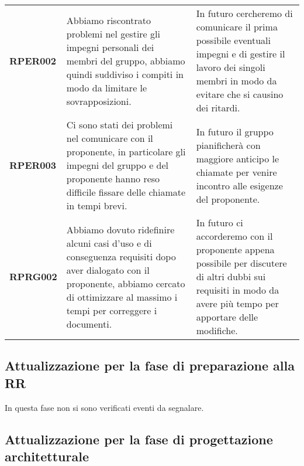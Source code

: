 \documentclass[../piano-di-progetto]{subfiles}
\begin{document}
\begin{longtable}[H]{|p{10em}|p{17em}|p{17em}|}
  \textbf{RPER002}                                    & Abbiamo riscontrato problemi nel gestire gli impegni personali dei membri del gruppo, abbiamo quindi suddiviso i compiti in modo da limitare le sovrapposizioni.                                                        & In futuro cercheremo di comunicare il prima possibile eventuali impegni e di gestire il lavoro dei singoli membri in modo da evitare che si causino dei ritardi.                             \\
  \textbf{RPER003}                                    & Ci sono stati dei problemi nel comunicare con il proponente, in particolare gli impegni del gruppo e del proponente hanno reso difficile fissare delle chiamate in tempi brevi.                                         & In futuro il gruppo pianificherà con maggiore anticipo le chiamate per venire incontro alle esigenze del proponente.                                                                         \\
  \textbf{RPRG002}                                    & Abbiamo dovuto ridefinire alcuni casi d'uso e di conseguenza requisiti dopo aver dialogato con il proponente, abbiamo cercato di ottimizzare al massimo i tempi per correggere i documenti.                             & In futuro ci accorderemo con il proponente appena possibile per discutere di altri dubbi sui requisiti in modo da avere più tempo per apportare delle modifiche.                             \\
\end{longtable}


\subsection{Attualizzazione per la fase di preparazione alla RR}%
\label{sub:attualizzazione_fase_prep_RR}
In questa fase non si sono verificati eventi da segnalare.

\subsection{Attualizzazione per la fase di progettazione architetturale}%
\label{sub:attualizzazione_per_la_fase_di_progettazione_architetturale}
\end{document}
